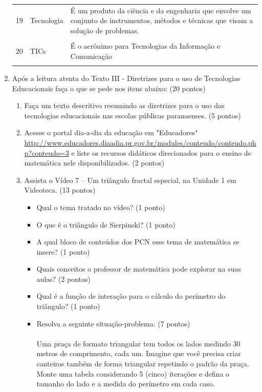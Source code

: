 \documentclass[a4paper, 12pt]{article}
\begin{document}
\begin{enumerate}
\begin{tabular}{|m{0.5cm}|m{5cm}|m{8cm}|}
      \hline
      19 & Tecnologia & É um produto da ciẽncia e da engenharia que envolve um conjunto de instrumentos, métodos e técnicas que visam a solução de problemas. \\ \\
      \hline
      20 & TICs & É o acrônimo para Tecnologias da Informação e Comunicação \\ \\
      \hline
    \end{tabular}
  \item Após a leitura  atenta do Texto III - Diretrizes para o uso de Tecnologias Educacionais   faça o que se pede nos itens abaixo: (20 pontos)
    \begin{enumerate}
    \item Faça um texto descritivo  resumindo as diretrizes para o uso das tecnologias educacionais nas escolas públicas paranaenses. (5 pontos)
    \item Acesse o portal dia-a-dia da educação  em  "Educadores"
      \url{http://www.educadores.diaadia.pr.gov.br/modules/conteudo/conteudo.php?conteudo=3}
      e liste os recursos didáticos direcionados para o ensino de matemática nele disponibilizados. (2 pontos)
    \item Assista o Vídeo 7 – Um triângulo fractal especial, na Unidade 1 em Videoteca. (13 pontos)
      \begin{itemize}
      \item Qual o tema tratado no vídeo? (1 ponto)
      \item O que é o triângulo de Sierpinski? (1 ponto)
      \item A qual bloco de conteúdos dos PCN esse tema de matemática se insere? (1 ponto)
      \item Quais conceitos o professor de matemática pode explorar na suas aulas? (2 pontos)
      \item Qual é a função de interação para o cálculo do perímetro do triângulo? (1 ponto)
      \item Resolva a seguinte situação-problema: (7 pontos) \\ \\
        Uma praça de formato triangular tem todos os lados medindo 30 metros de comprimento, cada um. Imagine que você precisa criar canteiros também de forma triangular repetindo o padrão da praça. Monte uma tabela considerando 5 (cinco) iterações e defina o tamanho do lado e a medida do perímetro em cada caso. \\ \\

\end{itemize}
\end{enumerate}
\end{enumerate}
\end{document}
